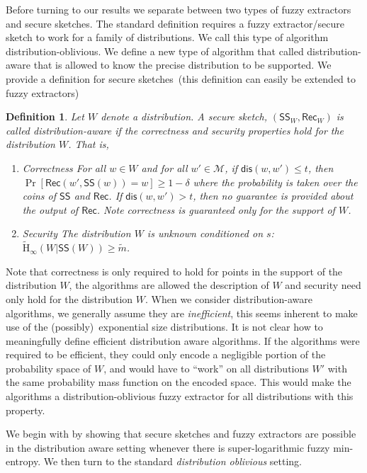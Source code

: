 \documentclass[11pt]{article}
\newcommand{\class}[1]{{\ensuremath{\mathsf{#1}}}}
\newcommand{\sketch}{\ensuremath{\class{SS}}\xspace}
\newcommand{\rec}{\ensuremath{\class{Rec}}\xspace}
\newcommand{\dis}{\ensuremath{\mathsf{dis}}}
\newcommand{\Hav}{\tilde{\mathrm{H}}_\infty}
\newtheorem{definition}[theorem]{Definition}
\begin{document}
Before turning to our results we separate between two types of fuzzy extractors and secure sketches.  The standard definition requires a fuzzy extractor/secure sketch to work for a family of distributions.  We call this type of algorithm distribution-oblivious.  We define a new type of algorithm that called distribution-aware that is allowed to know the precise distribution to be supported.  We provide a definition for secure sketches~(this definition can easily be extended to fuzzy extractors)

\begin{definition}
Let $W$ denote a distribution.  A secure sketch, $(\sketch_W, \rec_W)$ is called \emph{distribution-aware} if the correctness and security properties hold for the distribution $W$.  That is, 
\begin{enumerate}
\item \emph{Correctness} For all $w\in W$ and for all $w'\in\mathcal{M}$,  if $\dis(w,w')\leq t$, then $\Pr[\rec(w',\sketch(w))=w]\geq 1-\delta$ where the probability is taken over the coins of $\sketch$ and $\rec$.  If $\dis(w,w')>t$, then no guarantee is provided about the output of \rec.  Note correctness is guaranteed only for the support of $W$.
\item \emph{Security} The distribution $W$ is unknown conditioned on $s$: $\Hav(W|\sketch(W))\geq \tilde{m}$.
\end{enumerate}
\end{definition}
Note that correctness is only required to hold for points in the support of the distribution $W$, the algorithms are allowed the description of $W$ and security need only hold for the distribution $W$.  When we consider distribution-aware algorithms, we generally assume they are \emph{inefficient}, this seems inherent to make use of the (possibly)~exponential size distributions.  It is not clear how to meaningfully define efficient distribution aware algorithms.  If the algorithms were required to be efficient, they could only encode a negligible portion of the probability space of $W$, and would have to ``work'' on all distributions $W'$ with the same probability mass function on the encoded space.  This would make the algorithms a distribution-oblivious fuzzy extractor for all distributions with this property.

We begin with by showing that secure sketches and fuzzy extractors are possible in the distribution aware setting whenever there is super-logarithmic fuzzy min-entropy.  We then turn to the standard \emph{distribution oblivious} setting.
\end{document}
